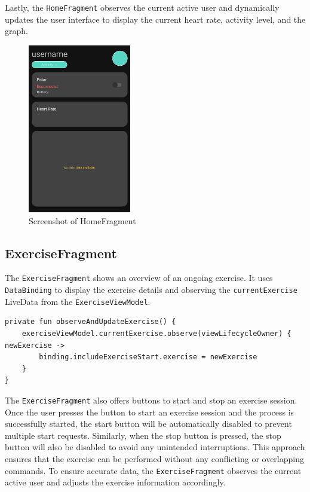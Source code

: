 Lastly, the \texttt{HomeFragment} observes the current active user and dynamically updates the user interface to display the current heart rate, activity level, and the graph.
\begin{figure}[H]
    \centering
    \includegraphics[width=0.4\textwidth]{images/homefragment-screenshot.png}
    \caption{Screenshot of HomeFragment}
    \label{fig:homefragment_screenshot}
\end{figure}

\subsection{ExerciseFragment}
The \texttt{ExerciseFragment} shows an overview of an ongoing exercise. It uses \texttt{DataBinding} to display the exercise details and observing the \texttt{currentExercise} LiveData from the \texttt{ExerciseViewModel}. 
\begin{lstlisting}[caption={Observer for currentExercise (Kotlin - HomeFragment)}]
private fun observeAndUpdateExercise() {
    exerciseViewModel.currentExercise.observe(viewLifecycleOwner) { newExercise ->
        binding.includeExerciseStart.exercise = newExercise
    }
}
\end{lstlisting}

The \texttt{ExerciseFragment} also offers buttons to start and stop an exercise session.
Once the user presses the button to start an exercise session and the process is successfully started, the start button will be automatically disabled to prevent multiple start requests. Similarly, when the stop button is pressed, the stop button will also be disabled to avoid any unintended interruptions. 
This approach ensures that the exercise can be performed without any conflicting or overlapping commands.
To ensure accurate data, the \texttt{ExerciseFragment} observes the current active user and adjusts the exercise information accordingly.

